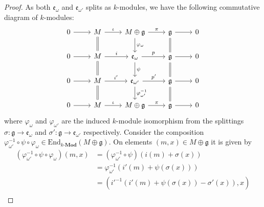 \begin{proof}
  As both $ \mathfrak{e}_{\omega} $ and $ \mathfrak{e}_{\omega'} $ splits as $ k $-modules, we have the following commutative diagram of $ k $-modules:
  \[\begin{tikzcd}
	  0 & M & {M\oplus\mathfrak{g}} & {\mathfrak{g}} & 0 \\
	  0 & M & {\mathfrak{e}_\omega} & {\mathfrak{g}} & 0 \\
	  0 & M & {\mathfrak{e}_{\omega'}} & {\mathfrak{g}} & 0 \\
	  0 & M & {M\oplus\mathfrak{g}} & {\mathfrak{g}} & 0
	  \arrow[from=1-1, to=1-2]
	  \arrow["\iota", from=1-2, to=1-3]
	  \arrow["\pi", from=1-3, to=1-4]
	  \arrow[from=1-4, to=1-5]
	  \arrow[from=2-1, to=2-2]
	  \arrow[from=3-1, to=3-2]
	  \arrow[from=4-1, to=4-2]
	  \arrow["i", from=2-2, to=2-3]
	  \arrow["p", from=2-3, to=2-4]
	  \arrow[from=2-4, to=2-5]
	  \arrow["\iota", from=4-2, to=4-3]
	  \arrow["{i'}", from=3-2, to=3-3]
	  \arrow["{p'}", from=3-3, to=3-4]
	  \arrow["\pi", from=4-3, to=4-4]
	  \arrow[from=4-4, to=4-5]
	  \arrow[from=3-4, to=3-5]
	  \arrow[Rightarrow, no head, from=1-4, to=2-4]
	  \arrow[Rightarrow, no head, from=2-4, to=3-4]
	  \arrow[Rightarrow, no head, from=3-4, to=4-4]
	  \arrow["{\varphi_\omega}", from=1-3, to=2-3]
	  \arrow["\psi", from=2-3, to=3-3]
	  \arrow["{\varphi_{\omega'}^{-1}}", from=3-3, to=4-3]
	  \arrow[Rightarrow, no head, from=1-2, to=2-2]
	  \arrow[Rightarrow, no head, from=2-2, to=3-2]
	  \arrow[Rightarrow, no head, from=3-2, to=4-2]
  \end{tikzcd}\]
  where $ \varphi_\omega $ and $ \varphi_{\omega'} $ are the induced $ k $-module isomorphism from the splittings $ \sigma:\mathfrak{g} \to \mathfrak{e}_{\omega} $ and $ \sigma':\mathfrak{g} \to \mathfrak{e}_{\omega'} $ respectively. Consider the composition $ \varphi_{\omega'}^{-1} \circ \psi \circ \varphi_{\omega} \in \text{End}_{k\text{-}\mathbf{Mod}}(M \oplus \mathfrak{g}) $. On elements $ (m,x) \in M \oplus \mathfrak{g} $ it is given by
  \begin{align*}
    (\varphi_{\omega'}^{-1} \circ \psi \circ \varphi_{\omega})(m,x) &= (\varphi_{\omega'}^{-1} \circ \psi)(i(m) + \sigma(x)) \\
                                                                    &= \varphi_{\omega'}^{-1}(i'(m) + \psi(\sigma(x))) \\
                                                                    &= (i'^{-1}(i'(m) + \psi(\sigma(x)) -\sigma'(x)), x) \\

\end{align*}
\end{proof}
